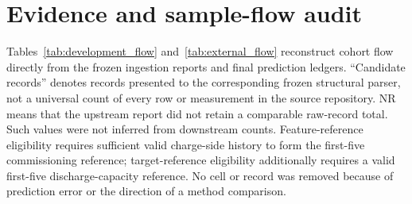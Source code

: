 \documentclass[11pt]{article}
\begin{document}
\section{Evidence and sample-flow audit}

Tables~\ref{tab:development_flow} and~\ref{tab:external_flow} reconstruct cohort flow directly from the frozen ingestion reports and final prediction ledgers. ``Candidate records'' denotes records presented to the corresponding frozen structural parser, not a universal count of every row or measurement in the source repository. NR means that the upstream report did not retain a comparable raw-record total. Such values were not inferred from downstream counts. Feature-reference eligibility requires sufficient valid charge-side history to form the first-five commissioning reference; target-reference eligibility additionally requires a valid first-five discharge-capacity reference. No cell or record was removed because of prediction error or the direction of a method comparison.
\end{document}
